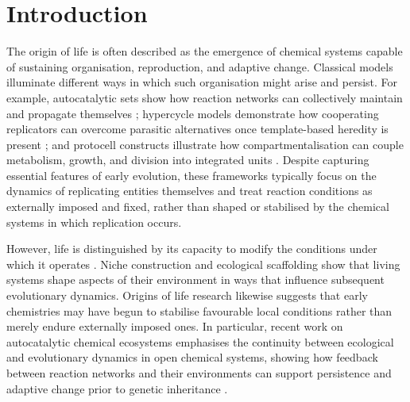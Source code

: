\section{Introduction}

The origin of life is often described as the emergence of chemical systems capable of sustaining organisation, reproduction, and adaptive change. Classical models illuminate different ways in which such organisation might arise and persist. For example, autocatalytic sets show how reaction networks can collectively maintain and propagate themselves \cite{Kauffman1986Autocatalytic}; hypercycle models demonstrate how cooperating replicators can overcome parasitic alternatives once template-based heredity is present \cite{Eigen1977}; and protocell constructs illustrate how compartmentalisation can couple metabolism, growth, and division into integrated units \cite{Szostak2001}. Despite capturing essential features of early evolution, these frameworks typically focus on the dynamics of replicating entities themselves and treat reaction conditions as externally imposed and fixed, rather than shaped or stabilised by the chemical systems in which replication occurs.

However, life is distinguished by its capacity to modify the conditions under which it operates \cite{OdlingSmee2003}. Niche construction \cite{Laland1999Niche} and ecological scaffolding \cite{Black2020} show that living systems shape aspects of their environment in ways that influence subsequent evolutionary dynamics. Origins of life research likewise suggests that early chemistries may have begun to stabilise favourable local conditions rather than merely endure externally imposed ones. In particular, recent work on autocatalytic chemical ecosystems emphasises the continuity between ecological and evolutionary dynamics in open chemical systems, showing how feedback between reaction networks and their environments can support persistence and adaptive change prior to genetic inheritance \cite{Baum2023Continuum,Kalambokidis2024EcoEvo}. 


